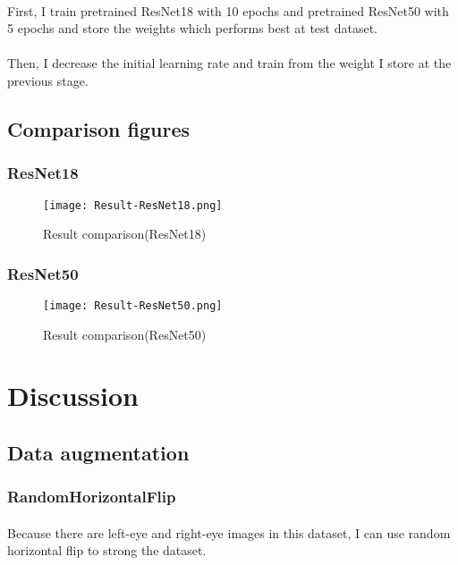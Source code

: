 \paragraph{}
First, I train pretrained ResNet18 with 10 epochs and pretrained ResNet50 with 5 epochs and store the weights which performs best at test dataset.
\paragraph{}
Then, I decrease the initial learning rate and train from the weight I store at the previous stage.
\subsection{Comparison figures}
\subsubsection{ResNet18}
\begin{figure}[!ht]
    \begin{center} 
        \texttt{[image: Result-ResNet18.png]}
        \caption{Result comparison(ResNet18)}
    \end{center} 
\end{figure}
\subsubsection{ResNet50}
\begin{figure}[!ht]
    \begin{center} 
        \texttt{[image: Result-ResNet50.png]}
        \caption{Result comparison(ResNet50)}
    \end{center} 
\end{figure}
\section{Discussion}
\subsection{Data augmentation}
\subsubsection{RandomHorizontalFlip}
\paragraph{}
Because there are left-eye and right-eye images in this dataset, I can use random horizontal flip to strong the dataset.
